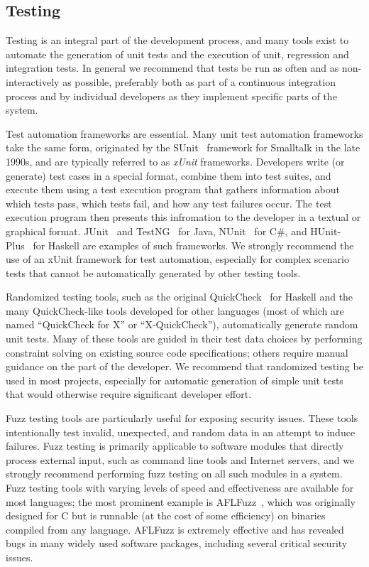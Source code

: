 \subsection{Testing}

Testing is an integral part of the development process, and many tools
exist to automate the generation of unit tests and the execution of
unit, regression and integration tests. In general we recommend that
tests be run as often and as non-interactively as possible, preferably
both as part of a continuous integration process and by individual
developers as they implement specific parts of the system.

Test automation frameworks are essential. Many unit test automation
frameworks take the same form, originated by the SUnit~\cite{SUnit}
framework for Smalltalk in the late 1990s, and are typically referred
to as \emph{xUnit} frameworks. Developers write (or generate) test
cases in a special format, combine them into test suites, and execute
them using a test execution program that gathers information about
which tests pass, which tests fail, and how any test failures
occur. The test execution program then presents this infromation to
the developer in a textual or graphical format.  JUnit~\cite{JUnit}
and TestNG~\cite{TestNG} for Java, NUnit~\cite{NUnit} for C\#, and
HUnit-Plus~\cite{HUnit-Plus} for Haskell are examples of such
frameworks. We strongly recommend the use of an xUnit framework for
test automation, especially for complex scenario tests that cannot be
automatically generated by other testing tools.

Randomized testing tools, such as the original
QuickCheck~\cite{QuickCheck} for Haskell and the many QuickCheck-like
tools developed for other languages (most of which are named
``QuickCheck for X'' or ``X-QuickCheck''), automatically generate
random unit tests. Many of these tools are guided in their test data
choices by performing constraint solving on existing source code
specifications; others require manual guidance on the part of the
developer. We recommend that randomized testing be used in most
projects, especially for automatic generation of simple unit tests
that would otherwise require significant developer effort.

Fuzz testing tools are particularly useful for exposing security
issues. These tools intentionally test invalid, unexpected, and random
data in an attempt to induce failures. Fuzz testing is primarily
applicable to software modules that directly process external input,
such as command line tools and Internet servers, and we strongly
recommend performing fuzz testing on all such modules in a
system. Fuzz testing tools with varying levels of speed and
effectiveness are available for most languages; the most prominent
example is AFLFuzz~\cite{AFLFuzz}, which was originally designed for C
but is runnable (at the cost of some efficiency) on binaries compiled
from any language. AFLFuzz is extremely effective and has revealed
bugs in many widely used software packages, including several critical
security issues.

